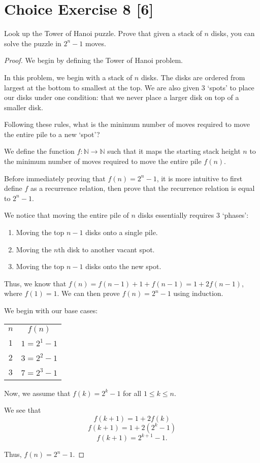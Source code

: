 \documentclass{article}
\begin{document}
\section*{Choice Exercise 8 [6]}

Look up the Tower of Hanoi puzzle. Prove that given a stack of \(n\) disks, you 
can solve the puzzle in \(2^n - 1\) moves.

\begin{proof}
    We begin by defining the Tower of Hanoi problem. 
    
    In this problem, we begin 
    with a stack of \(n\) disks. The disks are ordered from largest at the bottom 
    to smallest at the top. We are also given 3 `spots' to place our disks under 
    one condition: that we never place a larger disk on top of a smaller disk. 

    Following these rules, what is the minimum number of moves required to move
    the entire pile to a new `spot'?
    
    We define the function \(f: \mathbb{N} \rightarrow \mathbb{N}\) such that it 
    maps the starting stack height \(n\) to the minimum number of moves required 
    to move the entire pile \(f(n)\).

    Before immediately proving that \(f(n) = 2^n - 1\), it is more intuitive to 
    first define \(f\) as a recurrence relation, then prove that the recurrence
    relation is equal to \(2^n -1\).

    We notice that moving the entire pile  of \(n\) disks essentially requires 3 `phases':
    \begin{enumerate}
        \item Moving the top \(n-1\) disks onto a single pile.
        \item Moving the \(n\)th disk to another vacant spot.
        \item Moving the top \(n-1\) disks onto the new spot.
    \end{enumerate}

    Thus, we know that \(f(n) = f(n-1) + 1 + f(n-1) = 1 + 2f(n-1)\), where \(f(1) = 1\).
    We can then prove \(f(n) = 2^n -1\) using induction. 

    We begin with our base cases:
    \begin{center}
        \begin{tabular}{c c}
            \(n\)   & \(f(n)\) \\
            1       & \(1 = 2^1 - 1\)\\
            2       & \(3 = 2^2 - 1\) \\
            3       & \(7 = 2^3 - 1\) \\
        \end{tabular}
    \end{center}

    Now, we assume that \(f(k) = 2^k -1 \) for all \(1 \le k \le n\).
    
    We see that
    \[f(k+1) = 1 + 2f(k)\]
    \[f(k+1) = 1 + 2(2^k - 1)\]
    \[f(k+1) = 2^{k+1} - 1.\]

    Thus, \(f(n) = 2^n - 1\).
\end{proof}
\end{document}
